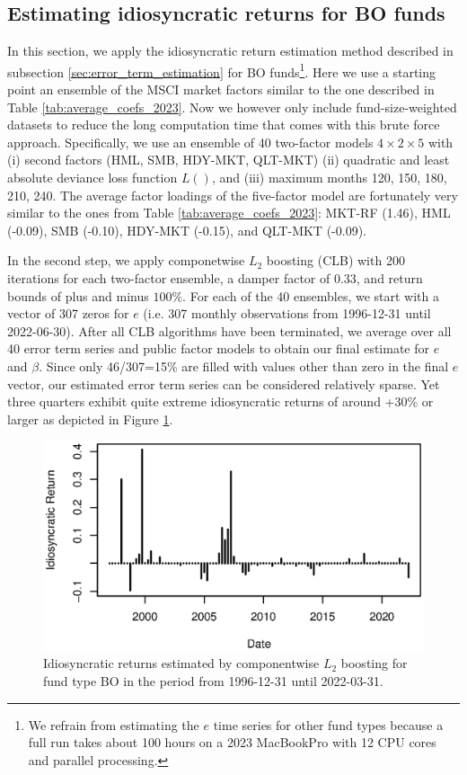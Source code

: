 \documentclass[12pt]{article}
\begin{document}
\subsection{Estimating idiosyncratic returns for BO funds}
\label{sec:idiosyncratic_BO}

In this section, we apply the idiosyncratic return estimation method described in subsection \ref{sec:error_term_estimation} for BO funds\footnote{We refrain from estimating the $e$ time series for other fund types because a full run takes about 100 hours on a 2023 MacBookPro with 12 CPU cores and parallel processing.}.
Here we use a starting point an ensemble of the MSCI market factors similar to the one described in Table \ref{tab:average_coefs_2023}.
Now we however only include fund-size-weighted datasets to reduce the long computation time that comes with this brute force approach.
Specifically, we use an ensemble of 40 two-factor models $4 \times 2 \times 5$  with (i) second factors (HML, SMB, HDY-MKT, QLT-MKT) (ii) quadratic and least absolute deviance loss function $L()$, and (iii) maximum months 120, 150, 180, 210, 240.
The average factor loadings of the five-factor model are fortunately very similar to the ones from Table \ref{tab:average_coefs_2023}:  
MKT-RF (1.46), 
HML (-0.09), 
SMB (-0.10), 
HDY-MKT (-0.15), and 
QLT-MKT (-0.09).

In the second step, we apply componetwise $L_2$ boosting (CLB) with 200 iterations for each two-factor ensemble, a damper factor of 0.33, and return bounds of plus and minus $100\%$.
For each of the 40 ensembles, we start with a vector of 307 zeros for $e$  (i.e. 307 monthly observations from 1996-12-31 until 2022-06-30).
After all CLB algorithms have been terminated, we average over all 40 error term series and public factor models to obtain our final estimate for $e$ and $\beta$.
Since only 46/307=15\% are filled with values other than zero in the final $e$ vector, our estimated error term series can be considered relatively sparse.
Yet three quarters exhibit quite extreme idiosyncratic returns of around +30\% or larger as depicted in Figure \ref{fig:clb_idio}.

\begin{figure}[H]
	\centering
	\includegraphics{Figures/ErrorSeriesBO}
	\caption{Idiosyncratic returns estimated by componentwise $L_2$ boosting for fund type BO in the period from 1996-12-31 until 2022-03-31.}
	\label{fig:clb_idio}
\end{figure}
\end{document}
